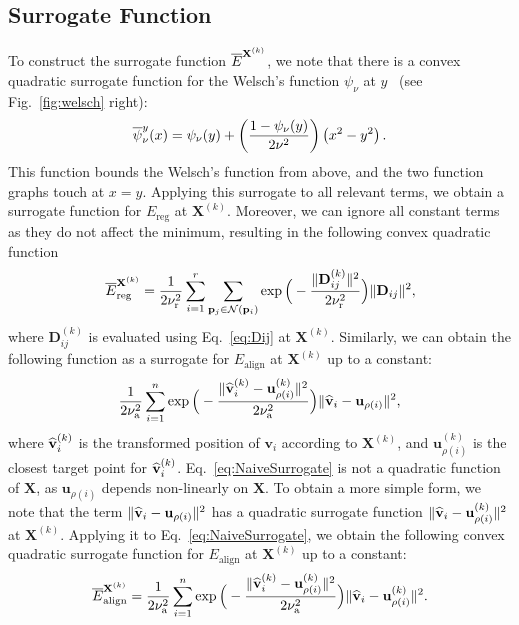 \subsection{Surrogate Function}
\label{sec:surrogate}
To construct the surrogate function $\overline{E}^{\mathbf{X}^{(k)}}$, we note that there is a convex quadratic surrogate function for the Welsch's function $\psi_{\nu}$ at $y$~\cite{ham2015robust} (see Fig.~\ref{fig:welsch} right):
\[
    \overline{\psi}_{\nu}^y (x) = \psi_{\nu}(y) + \left(\frac{1 - \psi_{\nu}(y)}{ 2 \nu^{2}}\right)\left(x^{2}-y^{2}\right).
\]
This function bounds the Welsch's function from above, and the two function graphs touch at $x = y$.
Applying this surrogate to all relevant terms, we obtain a surrogate function for ${E}_{\textrm{reg}}$ at $\mathbf{X}^{(k)}$. Moreover, we can ignore all constant terms as they do not affect the minimum, resulting in the following convex quadratic function
\begin{equation}
    \overline{E}_{\textrm{reg}}^{\mathbf{X}^{(k)}}
    = \frac{1}{2 \nu_{\textrm{r}}^2} \sum_{i=1}^{r} \sum_{\mathbf{p}_{j} \in \mathcal{N}(\mathbf{p}_{i})} \exp\Big(-\frac{\|\mathbf{D}_{ij}^{(k)}\|^2}{2 \nu_{\textrm{r}}^2}\Big) \|\mathbf{D}_{ij}\|^2,
    \label{eq:RegSurrogate}
\end{equation}
where $\mathbf{D}_{ij}^{(k)}$ is evaluated using Eq.~\eqref{eq:Dij} at $\mathbf{X}^{(k)}$. Similarly, we can obtain the following function as a surrogate for ${E}_{\textrm{align}}$ at $\mathbf{X}^{(k)}$ up to a constant:
\begin{equation}
    \frac{1}{2 \nu_{\textrm{a}}^2} \sum_{i=1}^{n} \exp\Big(-\frac{\|\widehat{\mathbf{v}}_i^{(k)} -\mathbf{u}_{\rho(i)}^{(k)}\|^2}{2 \nu_{\textrm{a}}^2}\Big) \|\widehat{\mathbf{v}}_i -\mathbf{u}_{\rho(i)}\|^2,
    \label{eq:NaiveSurrogate}
\end{equation}
where $\widehat{\mathbf{v}}_i^{(k)}$ is the transformed position of $\mathbf{v}_i$ according to $\mathbf{X}^{(k)}$, and $\mathbf{u}_{\rho(i)}^{(k)}$ is the closest target point for $\widehat{\mathbf{v}}_i^{(k)}$. Eq.~\eqref{eq:NaiveSurrogate} is not a quadratic function of $\mathbf{X}$, as $\mathbf{u}_{\rho(i)}$ depends non-linearly on $\mathbf{X}$. To obtain a more simple form, we note that the term $\|\widehat{\mathbf{v}}_i -\mathbf{u}_{\rho(i)}\|^2$ has a quadratic surrogate function $\|\widehat{\mathbf{v}}_i -\mathbf{u}_{\rho(i)}^{(k)}\|^2$ at $\mathbf{X}^{(k)}$. Applying it to Eq.~\eqref{eq:NaiveSurrogate}, we obtain the following convex quadratic surrogate function for ${E}_{\textrm{align}}$  at $\mathbf{X}^{(k)}$ up to a constant:
\begin{equation}
\overline{E}_{\textrm{align}}^{\mathbf{X}^{(k)}} = \frac{1}{2 \nu_{\textrm{a}}^2} \sum_{i=1}^{n} \exp\Big(-\frac{\|\widehat{\mathbf{v}}_i^{(k)} -\mathbf{u}_{\rho(i)}^{(k)}\|^2}{2 \nu_{\textrm{a}}^2}\Big) \|\widehat{\mathbf{v}}_i -\mathbf{u}_{\rho(i)}^{(k)}\|^2.
\label{eq:AlignSurrogate}
\end{equation}
